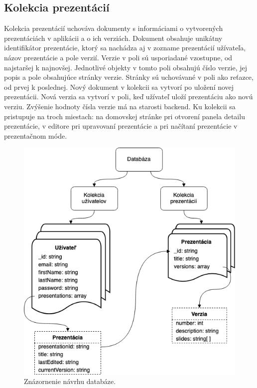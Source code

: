 \subsection*{Kolekcia prezentácií}
Kolekcia prezentácií uchováva dokumenty s informáciami o vytvorených prezentáciách v aplikácii a o ich verziách. Dokument obsahuje unikátny identifikátor prezentácie, ktorý sa nachádza aj v zozname prezentácií užívateľa, názov prezentácie a pole verzií. Verzie v poli sú usporiadané vzostupne, od najstaršej k najnovšej. Jednotlivé objekty v tomto poli obsahujú číslo verzie, jej popis a pole obsahujúce stránky verzie. Stránky sú uchovávané v poli ako reťazce, od prvej k poslednej. Nový dokument v kolekcii sa vytvorí po uložení novej prezentácii. Nová verzia sa vytvorí v poli, keď užívateľ uloží prezentáciu ako novú verziu. Zvýšenie hodnoty čísla verzie má na starosti backend. Ku kolekcii sa pristupuje na troch miestach: na domovskej stránke pri otvorení panela detailu prezentácie, v editore pri upravovaní prezentácie a pri načítaní prezentácie v prezentačnom móde.

    \begin{figure}[!hbt]
        \centering
        \includegraphics[scale=0.6]{obrazky/databaza.png}
        \caption{Znázornenie návrhu databáze.}
        \label{pic:database}
    \end{figure}
    
